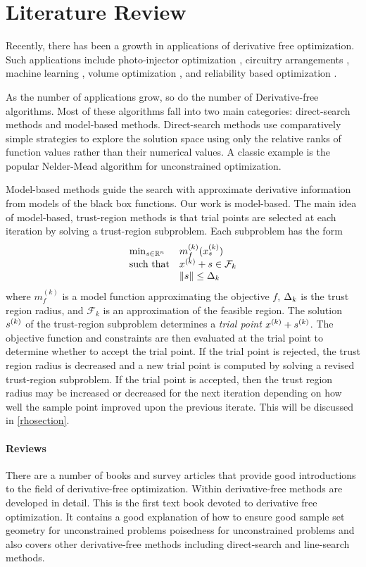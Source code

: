 \section{Literature Review}

Recently, there has been a growth in applications of derivative free optimization.
Such applications include photo-injector optimization \cite{1742-6596-874-1-012062}, 
circuitry arrangements \cite{PLOSKAS201816}, machine learning \cite{KS2018}, volume optimization \cite{Cheng2017}, 
and reliability based optimization \cite{Gao2017}.

As the number of applications grow, so do the number of Derivative-free algorithms.
Most of these algorithms fall into two main categories:  direct-search methods and model-based methods.
Direct-search methods use comparatively simple strategies to explore the solution space 
using only the relative ranks of function values rather than their numerical values.
A classic example is the popular Nelder-Mead algorithm \cite{10.1093/comjnl/7.4.308} for unconstrained optimization.

Model-based methods guide the search with approximate derivative information from models of the black box functions.
Our work is model-based.
The main idea of model-based, trust-region methods is that trial points are selected at each iteration by solving a trust-region subproblem.  
Each subproblem has the form 
\[ \begin{array}{ll} \min_{s \in \mathbb R^n} & m_f^{(k)}(x^{(k)}_s) \\ 
\textrm{such that} & x^{(k)}+s \in \mathcal{F}_k \\
& {\left\|s\right\|} \le \Delta_k
\end{array} \]
where $m_f^{(k)}$ is a model function approximating the objective $f$,   $\Delta_k$ is the trust region radius,  
and $\mathcal{F}_k$ is an approximation of the feasible region. 
The solution ${{s}^{(k)}}$ of the trust-region subproblem determines a {\em trial point} $x^{(k)} + {{s}^{(k)}}$.  
The objective function and constraints are then evaluated at the trial point to determine whether to accept the trial point.   
If the trial point is rejected, the trust region radius is decreased and a new trial point is computed by solving a revised trust-region subproblem.     
If the trial point is accepted, then the trust region radius may be increased or decreased for the next iteration 
depending on how well the sample point improved upon the previous iterate.
This will be discussed in \cref{rhosection}.

\paragraph*{Reviews}
There are a number of books and survey articles that provide good introductions to the field of derivative-free optimization.
Within \cite{introduction_book} derivative-free methods are developed in detail.
This is the first text book devoted to derivative free optimization.
It contains a good explanation of how to ensure good sample set geometry for unconstrained problems  poisedness for unconstrained problems and also covers other derivative-free 
methods including direct-search and line-search methods.

